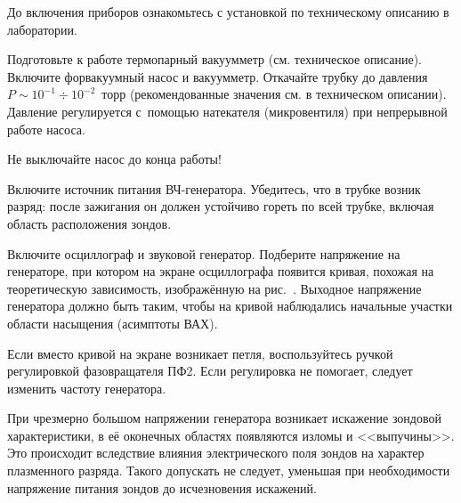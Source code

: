 \begin{lab:task}



\item До включения приборов ознакомьтесь с установкой по техническому описанию 
в лаборатории.

\item Подготовьте к работе термопарный вакуумметр (см. техническое описание). 
Включите форвакуумный насос и вакуумметр. 
Откачайте трубку до давления $P\sim 10^{-1}\div 10^{-2}$~торр (рекомендованные
значения см. в техническом описании). Давление
регулируется с~помощью натекателя (микровентиля) при непрерывной работе
насоса.

\begin{lab:warning}
    Не выключайте насос до конца работы!
\end{lab:warning}

\item Включите источник питания ВЧ-генератора. Убедитесь, что
в трубке возник разряд: после зажигания он должен устойчиво гореть 
по всей трубке, включая область расположения зондов.

\item  Включите осциллограф и звуковой генератор. 
Подберите напряжение на генераторе, при котором на экране осциллографа 
появится кривая, похожая на теоретическую зависимость, изображённую на
рис.~.
Выходное напряжение генератора должно быть таким, чтобы на кривой 
наблюдались начальные участки области насыщения (асимптоты ВАХ).

Если вместо кривой на экране возникает петля, воспользуйтесь ручкой 
регулировкой фазовращателя ПФ2. Если регулировка не помогает, следует 
изменить частоту генератора.

При чрезмерно большом напряжении генератора
возникает искажение зондовой характеристики, в её оконечных областях появляются
изломы и <<выпучины>>. Это происходит вследствие влияния электрического поля зондов
на характер плазменного разряда. Такого допускать не следует, уменьшая
при необходимости напряжение питания зондов до исчезновения искажений.



\end{lab:task}
